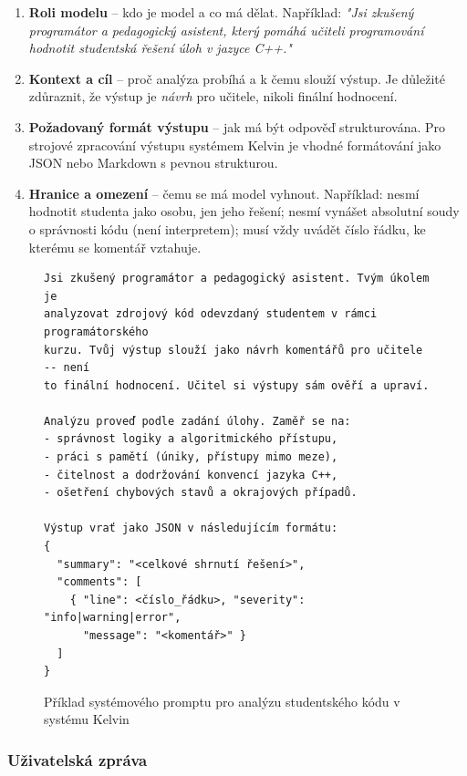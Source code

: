 \begin{enumerate}
    \item \textbf{Roli modelu} -- kdo je model a co má dělat.
    Například: \emph{"Jsi zkušený programátor a pedagogický asistent, který pomáhá učiteli programování hodnotit studentská řešení úloh v jazyce C++."}

    \item \textbf{Kontext a cíl} -- proč analýza probíhá a k čemu slouží výstup.
    Je důležité zdůraznit, že výstup je \emph{návrh} pro učitele, nikoli finální hodnocení.

    \item \textbf{Požadovaný formát výstupu} -- jak má být odpověď strukturována.
    Pro strojové zpracování výstupu systémem Kelvin je vhodné formátování jako JSON nebo Markdown s pevnou strukturou.

    \item \textbf{Hranice a omezení} -- čemu se má model vyhnout.
    Například: nesmí hodnotit studenta jako osobu, jen jeho řešení; nesmí vynášet absolutní soudy o správnosti kódu (není interpretem); musí vždy uvádět číslo řádku, ke kterému se komentář vztahuje.
\end{enumerate}

\begin{figure}[H]
    \centering
    \begin{verbatim}
Jsi zkušený programátor a pedagogický asistent. Tvým úkolem je
analyzovat zdrojový kód odevzdaný studentem v rámci programátorského
kurzu. Tvůj výstup slouží jako návrh komentářů pro učitele -- není
to finální hodnocení. Učitel si výstupy sám ověří a upraví.

Analýzu proveď podle zadání úlohy. Zaměř se na:
- správnost logiky a algoritmického přístupu,
- práci s pamětí (úniky, přístupy mimo meze),
- čitelnost a dodržování konvencí jazyka C++,
- ošetření chybových stavů a okrajových případů.

Výstup vrať jako JSON v následujícím formátu:
{
  "summary": "<celkové shrnutí řešení>",
  "comments": [
    { "line": <číslo_řádku>, "severity": "info|warning|error",
      "message": "<komentář>" }
  ]
}
    \end{verbatim}
    \caption{Příklad systémového promptu pro analýzu studentského kódu v systému Kelvin}
    \label{fig:system-prompt-example}
\end{figure}

\subsubsection*{Uživatelská zpráva}

